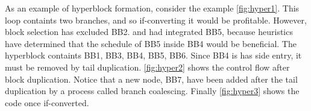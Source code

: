 As an example of hyperblock formation, consider the example \ref{fig:hyper1}. This loop containts two branches, and so if-converting it would be profitable. However, block selection has excluded BB2. and had integrated BB5, because heuristics have determined that the schedule of BB5 inside BB4 would be beneficial. The hyperblock containts {BB1, BB3, BB4, BB5, BB6}. Since BB4 is has side entry, it must be removed by tail duplication. \ref{fig:hyper2} shows the  control flow after block duplication. Notice that a new node, BB7, have been added after the tail duplication by a process called branch coalescing. Finally \ref{fig:hyper3} shows the code once if-converted.
\begin{figure}[h]
\end{figure}
